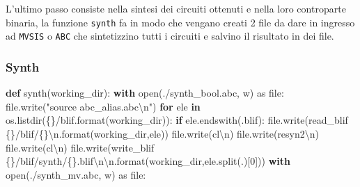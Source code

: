 \documentclass[
]{book}
\newenvironment{Shaded}{\begin{snugshade}}{\end{snugshade}}
\newcommand{\BuiltInTok}[1]{#1}
\newcommand{\CharTok}[1]{\textcolor[rgb]{0.31,0.60,0.02}{#1}}
\newcommand{\ControlFlowTok}[1]{\textcolor[rgb]{0.13,0.29,0.53}{\textbf{#1}}}
\newcommand{\DecValTok}[1]{\textcolor[rgb]{0.00,0.00,0.81}{#1}}
\newcommand{\ImportTok}[1]{#1}
\newcommand{\KeywordTok}[1]{\textcolor[rgb]{0.13,0.29,0.53}{\textbf{#1}}}
\newcommand{\NormalTok}[1]{#1}
\newcommand{\SpecialCharTok}[1]{\textcolor[rgb]{0.00,0.00,0.00}{#1}}
\newcommand{\StringTok}[1]{\textcolor[rgb]{0.31,0.60,0.02}{#1}}
\begin{document}
L'ultimo passo consiste nella sintesi dei circuiti ottenuti e nella loro controparte binaria, la funzione \texttt{synth} fa in modo che vengano creati 2 file da dare in ingresso ad \texttt{MVSIS} o \texttt{ABC} che sintetizzino tutti i circuiti e salvino il risultato in dei file.

\hypertarget{synth}{%
\subsubsection{Synth}\label{synth}}

\begin{Shaded}
\begin{Highlighting}[]
\KeywordTok{def}\NormalTok{ synth(working\_dir):  }
  \ControlFlowTok{with} \BuiltInTok{open}\NormalTok{(}\StringTok{\textquotesingle{}./synth\_bool.abc\textquotesingle{}}\NormalTok{, }\StringTok{\textquotesingle{}w\textquotesingle{}}\NormalTok{) }\ImportTok{as} \BuiltInTok{file}\NormalTok{:}
    \BuiltInTok{file}\NormalTok{.write(}\StringTok{"source abc\_alias.abc}\CharTok{\textbackslash{}n}\StringTok{"}\NormalTok{)}
    \ControlFlowTok{for}\NormalTok{ ele }\KeywordTok{in}\NormalTok{ os.listdir(}\StringTok{\textquotesingle{}}\SpecialCharTok{\{\}}\StringTok{/blif\textquotesingle{}}\NormalTok{.}\BuiltInTok{format}\NormalTok{(working\_dir)):}
      \ControlFlowTok{if}\NormalTok{ ele.endswith(}\StringTok{\textquotesingle{}.blif\textquotesingle{}}\NormalTok{):}
        \BuiltInTok{file}\NormalTok{.write(}\StringTok{\textquotesingle{}read\_blif }\SpecialCharTok{\{\}}\StringTok{/blif/}\SpecialCharTok{\{\}}\CharTok{\textbackslash{}n}\StringTok{\textquotesingle{}}\NormalTok{.}\BuiltInTok{format}\NormalTok{(working\_dir,ele))}
        \BuiltInTok{file}\NormalTok{.write(}\StringTok{\textquotesingle{}cl}\CharTok{\textbackslash{}n}\StringTok{\textquotesingle{}}\NormalTok{)}
        \BuiltInTok{file}\NormalTok{.write(}\StringTok{\textquotesingle{}resyn2}\CharTok{\textbackslash{}n}\StringTok{\textquotesingle{}}\NormalTok{)}
        \BuiltInTok{file}\NormalTok{.write(}\StringTok{\textquotesingle{}cl}\CharTok{\textbackslash{}n}\StringTok{\textquotesingle{}}\NormalTok{)}
        \BuiltInTok{file}\NormalTok{.write(}\StringTok{\textquotesingle{}write\_blif }\SpecialCharTok{\{\}}\StringTok{/blif/synth/}\SpecialCharTok{\{\}}\StringTok{.blif}\CharTok{\textbackslash{}n\textbackslash{}n}\StringTok{\textquotesingle{}}\NormalTok{.}\BuiltInTok{format}\NormalTok{(working\_dir,ele.split(}\StringTok{\textquotesingle{}.\textquotesingle{}}\NormalTok{)[}\DecValTok{0}\NormalTok{]))}
  \ControlFlowTok{with} \BuiltInTok{open}\NormalTok{(}\StringTok{\textquotesingle{}./synth\_mv.abc\textquotesingle{}}\NormalTok{, }\StringTok{\textquotesingle{}w\textquotesingle{}}\NormalTok{) }\ImportTok{as} \BuiltInTok{file}\NormalTok{:}

\end{Highlighting}
\end{Shaded}
\end{document}
